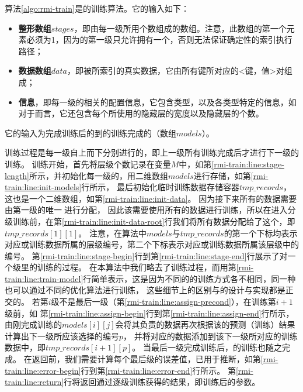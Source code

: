 算法\ref{algo:rmi-train}是{\rmi}的训练算法。它的输入如下：
\begin{itemize}
  \item \textbf{整形数组$stages$}，即由{\rmi}每一级所用{\model}个数组成的数组。注意，此数组的第一个元素必须为1，因为{\rmi}的第一级只允许拥有一个{\model}，否则无法保证确定性的索引执行路径；
  \item \textbf{数据数组$data$}，即被{\rmi}所索引的真实数据，它由所有键所对应的<键，{\cdf}值>对组成；
  \item \textbf{{\model}信息}，即每一级的{\model}相关的配置信息，它包含{\model}类型，以及各类型{\model}特定的信息，如对于{\nn}而言，它还包含每个{\nn}所使用的隐藏层的宽度以及隐藏层的个数。
\end{itemize}
它的输入为完成训练后的到的训练完成的{\rmi}（{\model}数组$models$）。

训练过程是每一级自上而下分别进行的，即上一级所有{\model}训练完成后才进行下一级{\model}的训练。
训练开始，首先将{\model}层级个数记录在变量$M$中，如第\ref{rmi-train:line:stage-length}所示，并初始化{\rmi}每一级的{\model}，用二维数组$models$进行存储，如第\ref{rmi-train:line:init-models}行所示，
最后初始化临时训练数据存储容器$tmp\_records$，这也是一个二维数组，如第\ref{rmi-train:line:init-data}。
因为接下来所有的数据需要由第一级的唯一{\model}进行分配，
因此该{\model}需要使用所有的数据进行训练，所以在进入分级训练前，在第\ref{rmi-train:line:init-data-root}行我们将所有数据分配给了这个{\model}，即$tmp\_records[1][1]$。
注意，在算法中$models$与$tmp\_records$的第一个下标均表示对应{\model}或训练数据所属的层级编号，第二个下标表示对应{\model}或训练数据所属该层级中的{\model}编号。
第\ref{rmi-train:line:stage-begin}行到第\ref{rmi-train:line:stage-end}行展示了对一个级里的{\model}训练的过程。
在本算法中我们略去了{\model}训练过程，而用第\ref{rmi-train:line:train-model}行简单表示，这是因为不同的{\model}的训练方式各不相同，同一种{\model}也可以通过不同的优化算法进行训练，
这些细节上的区别与{\rmi}的设计与实现都是正交的。
若第$i$级不是最后一级（第\ref{rmi-train:line:assign-precond}），在训练第$i+1$级{\model}前，如
第\ref{rmi-train:line:assign-begin}行到第\ref{rmi-train:line:assign-end}行所示，由刚完成训练的{\model}$models[i][j]$会将其负责的数据再次根据该{\model}的预测（训练）结果计算出下一级所应该选择的{\model}编号$p$，
并将对应的数据添加到该下一级{\model}所对应的训练数据中，即$tmp\_records[i+1][p]$。
当最后一级{\model}完成训练后，{\rmi}的训练也随之完成。
在返回前，我们需要计算每个最后级{\model}的误差值，已用于{\rmi}推断，如第\ref{rmi-train:line:error-begin}行到第\ref{rmi-train:line:error-end}行所示。
第\ref{rmi-train:line:return}行将返回通过逐级训练获得的{\model}结果，即训练后的{\model}参数。


